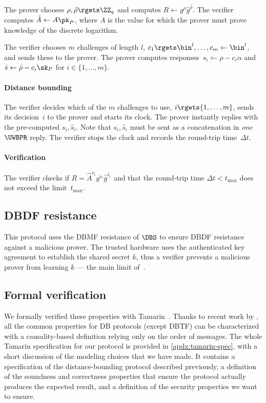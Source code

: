 The prover chooses \(\rho, \hat\rho\rgets \ZZ_q\) and computes \(R\gets g^\rho 
  \hat g^{\hat\rho}\).
The verifier computes \(\hat A\gets A \pk_P\), where \(A\) is the value for 
which the prover must prove knowledge of the discrete logarithm.

The verifier chooses \(m\) challenges of length \(l\), \(c_1\rgets \bin^l, 
  \dotsc, c_m\gets \bin^l\), and sends these to the prover.
The prover computes responses~\(s_i\gets \rho - c_i\alpha\) and \(\hat s\gets 
  \hat\rho - c_i\sk_P\) for \(i\in \{1, \dotsc, m\}\).

\paragraph*{Distance bounding}

The verifier decides which of the \(m\) challenges to use, \(i\rgets \{1, 
  \dotsc, m\}\), sends its decision~\(i\) to the prover and starts its clock.
The prover instantly replies with the pre-computed \(s_i, \hat s_i\).
Note that \(s_i, \hat s_i\) must be sent as a concatenation in \emph{one} 
\(\UWBPR\) reply.
The verifier stops the clock and records the round-trip time~\(\Delta t\).

\paragraph*{Verification}

The verifier checks if \(R = \hat A^{c_i} g^{s_i} \hat g^{\hat s_i}\) and that 
the round-trip time \(\Delta t < t_{\max}\) does not exceed the 
limit~\(t_{\max}\).


\subsection{\acs*{DBDF} resistance}

This protocol uses the \ac{DBMF} resistance of \(\DBS\) to ensure \ac{DBDF} 
resistance against a malicious prover.
The trusted hardware uses the authenticated key agreement to establish the 
shared secret \(k\), thus a verifier prevents a malicious prover from learning 
\(k\) --- the main limit of~\cite{UWBPR}.

\subsection{Formal verification}

We formally verified these properties with Tamarin~\cite{meier2013tamarin}.
Thanks to recent work by \textcite{TamarinDB}, all the common properties for 
\ac{DB} protocols (except \ac{DBTF}) can be characterized with a 
causality-based definition relying only on the order of messages.
The whole Tamarin specification for our protocol is provided in 
\cref{apdx:tamarin-spec}, with a short discussion of the modeling choices that 
we have made.
It contains a specification of the distance-bounding protocol described 
previously, a definition of the soundness and correctness properties that 
ensure the protocol actually produces the expected result, and a definition of 
the security properties we want to ensure.

